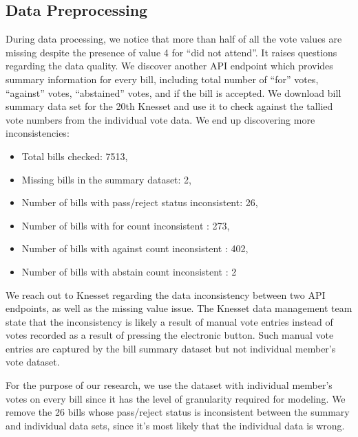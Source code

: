 \subsection{Data Preprocessing}

During data processing, we notice that more than half of all the vote values
are missing despite the presence of value 4 for ``did not attend''.
It raises questions regarding the data quality.
We discover another API endpoint which provides summary information for
every bill, including total number of ``for'' votes, ``against'' votes,
``abstained'' votes, and if the bill is accepted.
We download bill summary data set for the 20th Knesset and use it
to check against the tallied vote numbers from the individual vote data.
We end up discovering more inconsistencies:

\begin{itemize}
  \item Total bills checked: 7513,
  \item Missing bills in the summary dataset: 2,
  \item Number of bills with pass/reject status inconsistent: 26,
  \item Number of bills with for count inconsistent : 273,
  \item Number of bills with against count inconsistent : 402,
  \item Number of bills with abstain count inconsistent : 2
\end{itemize}

We reach out to Knesset regarding the data inconsistency between
two API endpoints, as well as the missing value issue.
The Knesset data management team state that the inconsistency
is likely a result of manual vote entries instead of votes recorded
as a result of pressing the electronic button.
Such manual vote entries are captured by the bill summary dataset
but not individual member's vote dataset.

For the purpose of our research, we use the dataset with individual member's
votes on every bill since it has the level of granularity required for modeling.
We remove the 26 bills whose pass/reject status is inconsistent between
the summary and individual data sets, since it's most likely that
the individual data is wrong.


